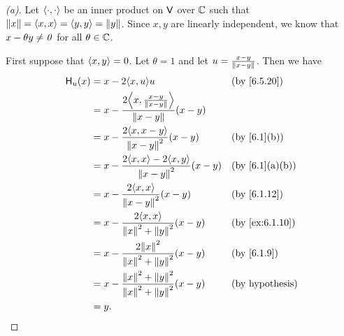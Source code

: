 \begin{proof}[(a)]
  Let \(\left\langle\cdot, \cdot\right\rangle\) be an inner product on \(\mathsf{V}\) over \(\mathbb{C}\) such that \(\left\lVert x\right\rVert = \left\langle x, x\right\rangle = \left\langle y, y\right\rangle = \left\lVert y\right\rVert\).
  Since \(x, y\) are linearly independent, we know that \(x - \theta y \neq \mathit{0}\) for all \(\theta \in \mathbb{C}\).

  First suppose that \(\left\langle x, y\right\rangle = 0\).
  Let \(\theta = 1\) and let \(u = \frac{x - y}{\left\lVert x- y\right\rVert}\).
  Then we have
  \begin{align*}
    \lt{H}_u(x) & = x - 2 \inn{x, u} u                                                     &  & \by{6.5.20}            \\
                & = x - \frac{2 \inn{x, \frac{x - y}{\norm{x - y}}}}{\norm{x - y}} (x - y)                             \\
                & = x - \frac{2 \inn{x, x - y}}{\norm{x - y}^2} (x - y)                    &  & \by{6.1}[b]            \\
                & = x - \frac{2 \inn{x, x} - 2 \inn{x, y}}{\norm{x - y}^2} (x - y)         &  & \by{6.1}[a,b]          \\
                & = x - \frac{2 \inn{x, x}}{\norm{x - y}^2} (x - y)                        &  & \by{6.1.12}            \\
                & = x - \frac{2 \inn{x, x}}{\norm{x}^2 + \norm{y}^2} (x - y)               &  & \by{ex:6.1.10}         \\
                & = x - \frac{2 \norm{x}^2}{\norm{x}^2 + \norm{y}^2} (x - y)               &  & \by{6.1.9}             \\
                & = x - \frac{\norm{x}^2 + \norm{y}^2}{\norm{x}^2 + \norm{y}^2} (x - y)    &  & \text{(by hypothesis)} \\
                & = y.
  \end{align*}


\end{proof}
